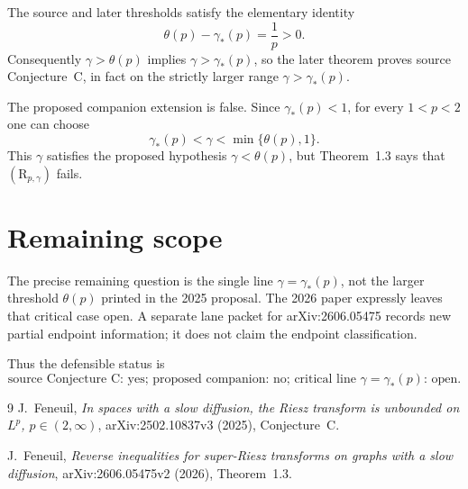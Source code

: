 \documentclass[11pt]{article}
\newcommand{\Riesz}{(\mathrm R_{p,\gamma})}
\begin{document}
The source and later thresholds satisfy the elementary identity
\[
 \theta(p)-\gamma_*(p)=\frac1p>0.
\]
Consequently $\gamma>\theta(p)$ implies $\gamma>\gamma_*(p)$, so the later
theorem proves source Conjecture~C, in fact on the strictly larger range
$\gamma>\gamma_*(p)$.

The proposed companion extension is false.  Since $\gamma_*(p)<1$, for every
$1<p<2$ one can choose
\[
 \gamma_*(p)<\gamma<\min\{\theta(p),1\}.
\]
This $\gamma$ satisfies the proposed hypothesis $\gamma<\theta(p)$, but
Theorem~1.3 says that $\Riesz$ fails.

\section{Remaining scope}

The precise remaining question is the single line $\gamma=\gamma_*(p)$, not
the larger threshold $\theta(p)$ printed in the 2025 proposal.  The 2026
paper expressly leaves that critical case open.  A separate lane packet for
arXiv:2606.05475 records new partial endpoint information; it does not claim
the endpoint classification.

Thus the defensible status is
\[
 \boxed{\text{source Conjecture C: yes; proposed companion: no;
 critical line $\gamma=\gamma_*(p)$: open.}}
\]

\begin{thebibliography}{9}
J.~Feneuil,
\emph{In spaces with a slow diffusion, the Riesz transform is unbounded on
$L^p$, $p\in(2,\infty)$}, arXiv:2502.10837v3 (2025), Conjecture~C.

J.~Feneuil,
\emph{Reverse inequalities for super-Riesz transforms on graphs with a slow
diffusion}, arXiv:2606.05475v2 (2026), Theorem~1.3.
\end{thebibliography}
\end{document}
